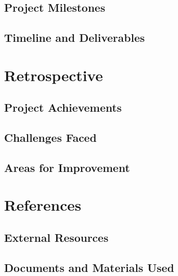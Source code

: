 \documentclass{report}
\begin{document}
\section{Project Milestones}
\section{Timeline and Deliverables}

\chapter{Retrospective}
\section{Project Achievements}
\section{Challenges Faced}
\section{Areas for Improvement}

\chapter{References}
\section{External Resources}
\section{Documents and Materials Used}
\end{document}
